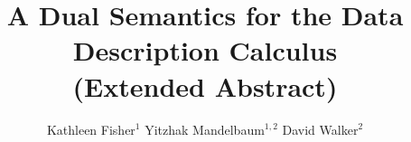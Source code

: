 \documentclass[tfpsymp,ams,pagenumbers]{tfp05symp}
\begin{document}
\title{A Dual Semantics for the Data Description Calculus\\(Extended Abstract)}
\author{Kathleen Fisher$^1$ \qquad Yitzhak Mandelbaum$^{1,2}$ \qquad David Walker$^2$}



\maketitle{}











\end{document}
